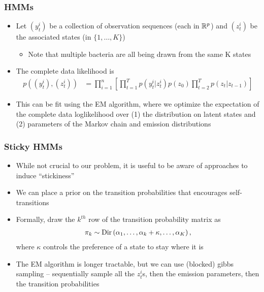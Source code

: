 \documentclass{beamer}
\begin{document}
\begin{frame}
  \frametitle{HMMs}
\begin{itemize}
\item Let $\left(y_{t}^{i}\right)$ be a collection of observation sequences
  (each in $\mathbb{R}^{p}$) and $\left(z_{t}^{i}\right)$ be the associated states
  (in $\{1, \dots, K\}$)
  \begin{itemize}
  \item Note that multiple bacteria are all being drawn from the same K states
  \end{itemize}
\item The complete data likelihood is
  \begin{align*}
    p\left(\left(y_{t}^{i}\right), \left(z_{t}^{i}\right)\right) &= \prod_{i = 1}^{n} \left[\prod_{t = 1}^{T} p\left(y_{t}^{i} \vert z_{t}^{i}\right) p\left(z_{0}\right)\prod_{t = 2}^{T} p\left(z_{t} \vert z_{t - 1}\right)\right]
  \end{align*}
\item This can be fit using the EM algorithm, where we optimize the expectation
  of the complete data loglikelihood over (1) the distribution on latent states
  and (2) parameters of the Markov chain and emission distributions
\end{itemize}  
\end{frame}

\begin{frame}
  \frametitle{Sticky HMMs}
\begin{itemize}
\item While not crucial to our problem, it is useful to be aware of approaches
  to induce ``stickiness''
\item We can place a prior on the transition probabilities that encourages
  self-transitions
  \item Formally, draw the $k^{th}$ row of the transition probability matrix as
\begin{align*}
  \pi_{k} \sim \textnormal{Dir}\left(\alpha_{1}, \dots, \alpha_{k} + \kappa, \dots, \alpha_{K}\right),
\end{align*}
where $\kappa$ controls the preference of a state to stay where it is
\item The EM algorithm is longer tractable, but we can use (blocked) gibbs
  sampling -- sequentially sample all the $z_{t}^{i}$s, then the emission
  parameters, then the transition probabilities
\end{itemize}
\end{frame}
\end{document}
